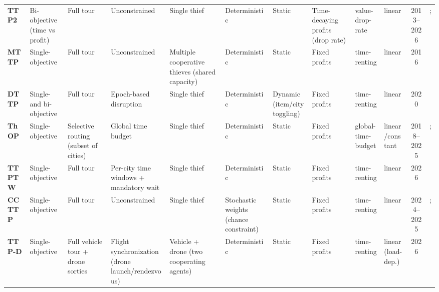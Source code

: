 \begin{center}
\begin{tabular}{@{}lp{1.35cm}p{1.35cm}p{2.5cm}p{2.5cm}p{2.5cm}p{1.0cm}p{1.35cm}p{1.55cm}p{1.55cm}cp{2.0cm}@{}}
\textbf{TTP2} & Bi-objective (time vs profit) & Full tour & Unconstrained & Single thief & Deterministic & Static & Time-decaying profits (drop rate) & value-drop-rate & linear & 2013--2026 & \citet{bonyadi2013travelling}; \citet{viet2026advanced} \\
\textbf{MTTP} & Single-objective & Full tour & Unconstrained & Multiple cooperative thieves (shared capacity) & Deterministic & Static & Fixed profits & time-renting & linear & 2016 & \citet{chand2016fast} \\
\textbf{DTTP} & Single- and bi-objective & Full tour & Epoch-based disruption & Single thief & Deterministic & Dynamic (item/city toggling) & Fixed profits & time-renting & linear & 2020 & \citet{sachdeva2020dynamic} \\
\textbf{ThOP} & Single-objective & Selective routing (subset of cities) & Global time budget & Single thief & Deterministic & Static & Fixed profits & global-time-budget & linear/constant & 2018--2025 & \citet{santos2018thief}; \citet{bloch2025algorithms} \\
\textbf{TTPTW} & Single-objective & Full tour & Per-city time windows + mandatory wait & Single thief & Deterministic & Static & Fixed profits & time-renting & linear & 2026 & \citet{angmalisang2026traveling} \\
\textbf{CCTTP} & Single-objective & Full tour & Unconstrained & Single thief & Stochastic weights (chance constraint) & Static & Fixed profits & time-renting & linear & 2024--2025 & \citet{pathirage2024chance}; \citet{don2025weighted} \\
\textbf{TTP-D} & Single-objective & Full vehicle tour + drone sorties & Flight synchronization (drone launch/rendezvous) & Vehicle + drone (two cooperating agents) & Deterministic & Static & Fixed profits & time-renting & linear (load-dep.) & 2026 & \citet{murjani2026drive} \\
\bottomrule
\end{tabular}
\end{center}
